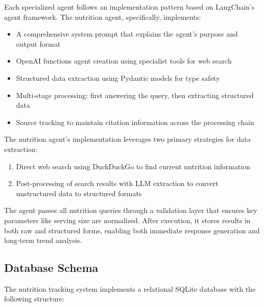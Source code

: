 \documentclass{ecai}
\begin{document}
Each specialized agent follows an implementation pattern based on LangChain's agent framework. The nutrition agent, specifically, implements:

\begin{itemize}[noitemsep,topsep=0pt]
    \item A comprehensive system prompt that explains the agent's purpose and output format
    \item OpenAI functions agent creation using specialist tools for web search
    \item Structured data extraction using Pydantic models for type safety
    \item Multi-stage processing: first answering the query, then extracting structured data
    \item Source tracking to maintain citation information across the processing chain
\end{itemize}

The nutrition agent's implementation leverages two primary strategies for data extraction:
\begin{enumerate}[noitemsep,topsep=0pt]
    \item Direct web search using DuckDuckGo to find current nutrition information
    \item Post-processing of search results with LLM extraction to convert unstructured data to structured formats
\end{enumerate}

The agent passes all nutrition queries through a validation layer that ensures key parameters like serving size are normalized. After execution, it stores results in both raw and structured forms, enabling both immediate response generation and long-term trend analysis.

\subsection{Database Schema}

The nutrition tracking system implements a relational SQLite database with the following structure:
\end{document}

